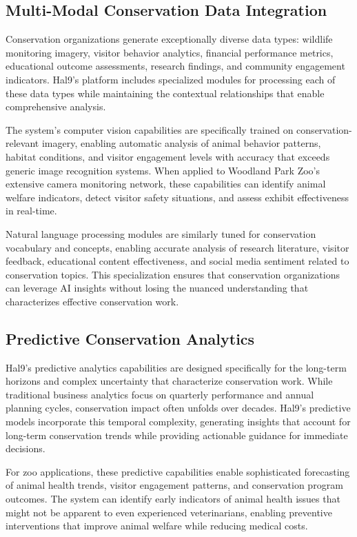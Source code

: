 \documentclass[
  Letterpaper,
]{scrbook}
\begin{document}
\subsection{Multi-Modal Conservation Data
Integration}\label{multi-modal-conservation-data-integration}

Conservation organizations generate exceptionally diverse data types:
wildlife monitoring imagery, visitor behavior analytics, financial
performance metrics, educational outcome assessments, research findings,
and community engagement indicators. Hal9's platform includes
specialized modules for processing each of these data types while
maintaining the contextual relationships that enable comprehensive
analysis.

The system's computer vision capabilities are specifically trained on
conservation-relevant imagery, enabling automatic analysis of animal
behavior patterns, habitat conditions, and visitor engagement levels
with accuracy that exceeds generic image recognition systems. When
applied to Woodland Park Zoo's extensive camera monitoring network,
these capabilities can identify animal welfare indicators, detect
visitor safety situations, and assess exhibit effectiveness in
real-time.

Natural language processing modules are similarly tuned for conservation
vocabulary and concepts, enabling accurate analysis of research
literature, visitor feedback, educational content effectiveness, and
social media sentiment related to conservation topics. This
specialization ensures that conservation organizations can leverage AI
insights without losing the nuanced understanding that characterizes
effective conservation work.

\subsection{Predictive Conservation
Analytics}\label{predictive-conservation-analytics}

Hal9's predictive analytics capabilities are designed specifically for
the long-term horizons and complex uncertainty that characterize
conservation work. While traditional business analytics focus on
quarterly performance and annual planning cycles, conservation impact
often unfolds over decades. Hal9's predictive models incorporate this
temporal complexity, generating insights that account for long-term
conservation trends while providing actionable guidance for immediate
decisions.

For zoo applications, these predictive capabilities enable sophisticated
forecasting of animal health trends, visitor engagement patterns, and
conservation program outcomes. The system can identify early indicators
of animal health issues that might not be apparent to even experienced
veterinarians, enabling preventive interventions that improve animal
welfare while reducing medical costs.
\end{document}
